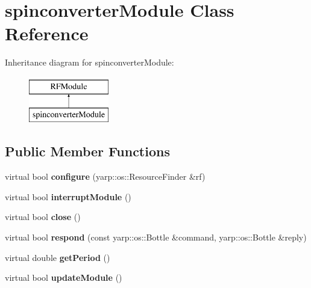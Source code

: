 \hypertarget{classspinconverterModule}{}\section{spinconverter\+Module Class Reference}
\label{classspinconverterModule}
Inheritance diagram for spinconverter\+Module\+:\begin{figure}[H]
\begin{center}
\leavevmode
\includegraphics[height=2.000000cm]{classspinconverterModule}
\end{center}
\end{figure}
\subsection*{Public Member Functions}
\begin{DoxyCompactItemize}
\item 
virtual bool {\bfseries configure} (yarp\+::os\+::\+Resource\+Finder \&rf)\hypertarget{classspinconverterModule_ac0b34ed884eb17bd4a6f52c8b3630a2c}{}\label{classspinconverterModule_ac0b34ed884eb17bd4a6f52c8b3630a2c}

\item 
virtual bool {\bfseries interrupt\+Module} ()\hypertarget{classspinconverterModule_a9893addfd6adc708ceccddc4c3e9183a}{}\label{classspinconverterModule_a9893addfd6adc708ceccddc4c3e9183a}

\item 
virtual bool {\bfseries close} ()\hypertarget{classspinconverterModule_acb2fc1926feaa32b83b9eeb4cd031b25}{}\label{classspinconverterModule_acb2fc1926feaa32b83b9eeb4cd031b25}

\item 
virtual bool {\bfseries respond} (const yarp\+::os\+::\+Bottle \&command, yarp\+::os\+::\+Bottle \&reply)\hypertarget{classspinconverterModule_a22d21aab95bd5e24501bae68ae3a5921}{}\label{classspinconverterModule_a22d21aab95bd5e24501bae68ae3a5921}

\item 
virtual double {\bfseries get\+Period} ()\hypertarget{classspinconverterModule_a8a9564ee39fec8095257846d7eb43ca6}{}\label{classspinconverterModule_a8a9564ee39fec8095257846d7eb43ca6}

\item 
virtual bool {\bfseries update\+Module} ()\hypertarget{classspinconverterModule_abc54e110dbae422e61b21de1d12f9fc0}{}\label{classspinconverterModule_abc54e110dbae422e61b21de1d12f9fc0}

\end{DoxyCompactItemize}



